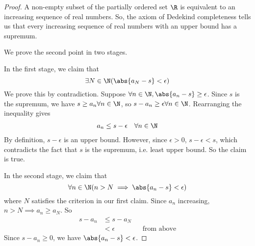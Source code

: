 \begin{proof}
  A non-empty subset of the partially ordered set $\R$ is equivalent to an increasing sequence of real numbers. So, the axiom of Dedekind completeness tells us that every increasing sequence of real numbers with an upper bound has a supremum.

  We prove the second point in two stages. 

  In the first stage, we claim that
  \[
    \exists N \in \N (\abs{a_N - s} < \epsilon)
  \]
  We prove this by contradiction. Suppose $\forall n \in \N, \abs{a_n - s} \geq \epsilon$. Since $s$ is the supremum, we have $s \geq a_n \forall n \in \N$, so $s - a_n \geq \epsilon \forall n \in \N$. Rearranging the inequality gives
  \begin{align*}
    a_n \leq s - \epsilon && \forall n \in \N
  \end{align*}
  By definition, $s - \epsilon$ is an upper bound. However, since $\epsilon > 0$, $s - \epsilon < s$, which contradicts the fact that $s$ is the supremum, i.e. least upper bound. So the claim is true.

  In the second stage, we claim that
  \[
    \forall n \in \N (n > N \implies \abs{a_n - s} < \epsilon)
  \]
  where $N$ satisfies the criterion in our first claim. Since $a_n$ increasing, $n > N \implies a_n \geq a_N$. So
  \begin{align*}
    s - a_n &\leq s - a_N \\
    &< \epsilon && \text{from above}
  \end{align*}
  Since $s - a_n \geq 0$, we have $\abs{a_n - s} < \epsilon$.
\end{proof}
